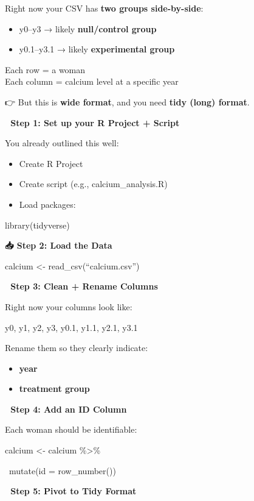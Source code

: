 \documentclass[
  letterpaper,
  DIV=11,
  numbers=noendperiod]{scrartcl}
\begin{document}
\begin{itemize}
\begin{itemize}
    Right now your CSV has \textbf{two groups side-by-side}:

    \begin{itemize}
    \item
      y0--y3 → likely \textbf{null/control group}
    \item
      y0.1--y3.1 → likely \textbf{experimental group}
    \end{itemize}

    Each row = a woman\\
    Each column = calcium level at a specific year

    👉 But this is \textbf{wide format}, and you need \textbf{tidy
    (long) format}.

    \textbf{🧱 Step 1: Set up your R Project + Script}

    You already outlined this well:

    \begin{itemize}
    \item
      Create R Project
    \item
      Create script (e.g., calcium\_analysis.R)
    \item
      Load packages:
    \end{itemize}

    library(tidyverse)

    \textbf{📥 Step 2: Load the Data}

    calcium \textless- read\_csv(``calcium.csv'')

    \textbf{🧹 Step 3: Clean + Rename Columns}

    Right now your columns look like:

    y0, y1, y2, y3, y0.1, y1.1, y2.1, y3.1

    Rename them so they clearly indicate:

    \begin{itemize}
    \item
      \textbf{year}
    \item
      \textbf{treatment group}
    \end{itemize}

    \textbf{🔄 Step 4: Add an ID Column}

    Each woman should be identifiable:

    calcium \textless- calcium \%\textgreater\%

    ~mutate(id = row\_number())

    \textbf{🔁 Step 5: Pivot to Tidy Format}


\end{itemize}
\end{itemize}
\end{document}
